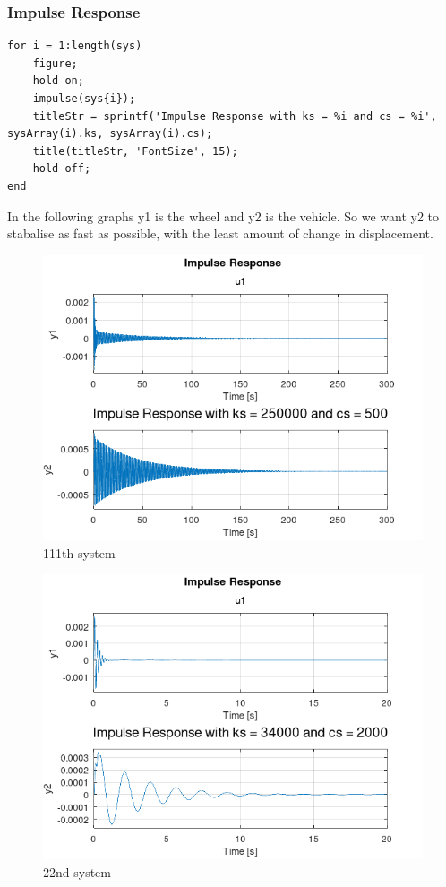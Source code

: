 \documentclass[11pt]{article}
\begin{document}
\subsubsection{Impulse Response}
\label{sec:orge1b9b37}
\begin{verbatim}
for i = 1:length(sys)
    figure;
    hold on;
    impulse(sys{i});
    titleStr = sprintf('Impulse Response with ks = %i and cs = %i', sysArray(i).ks, sysArray(i).cs);
    title(titleStr, 'FontSize', 15);
    hold off;
end
\end{verbatim}
In the following graphs y1 is the wheel and y2 is the vehicle. So we want y2 to stabalise as fast as possible, with the least amount of change in displacement.


\begin{figure}[h]
    \centering
    \includegraphics[width=.9\linewidth]{ENG204-Assignment-2-Impulse-Response-111.png}
    \caption{111th system}
    \label{fig:impulse_response_111}
\end{figure}

\begin{figure}[h]
    \centering
    \includegraphics[width=.9\linewidth]{ENG204-Assignment-2-Impulse-Response-22.png}
    \caption{22nd system}
    \label{fig:impulse_response_22}
  \end{figure}
\end{document}
